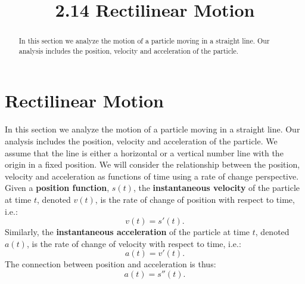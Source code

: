 \documentclass[handout]{ximera}
\title{2.14 Rectilinear Motion}
\begin{document}
\begin{abstract}
In this section we analyze the motion of a particle moving in a straight line. Our
analysis includes the position, velocity and acceleration of the particle.
\end{abstract}

\maketitle


\section{Rectilinear Motion}

In this section we analyze the motion of a particle moving in a straight line. Our
analysis includes the position, velocity and acceleration of the particle.
We assume that the line is either a horizontal or a vertical number line with the origin in a fixed position.
We will consider the relationship between the position, 
velocity and acceleration as functions of time using a rate of change perspective. \\
Given a \textbf{position function}, $s(t)$, the \textbf{instantaneous velocity} of the particle at time $t$, 
denoted $v(t)$, is the rate of change of position 
with respect to time, i.e.:
\[v(t) = s'(t).\]
Similarly, the \textbf{instantaneous acceleration} of the particle at time $t$, denoted $a(t)$, is the rate of change of 
velocity with respect to time, i.e.:
\[a(t) = v'(t).\]
The connection between position and acceleration is thus:
\[a(t) = s''(t).\]
\end{document}
